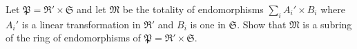 Let $\mathfrak{P} = \mathfrak{R}' \times \mathfrak{S}$ and let $\mathfrak{M}$ be the totality of endomorphisms $\sum_i A_i' \times B_i$ where $A_i'$ is a linear transformation in $\mathfrak{R}'$ and $B_i$ is one in $\mathfrak{S}$. Show that $\mathfrak{M}$ is a subring of the ring of endomorphisms of $\mathfrak{P} = \mathfrak{R}' \times \mathfrak{S}$.
